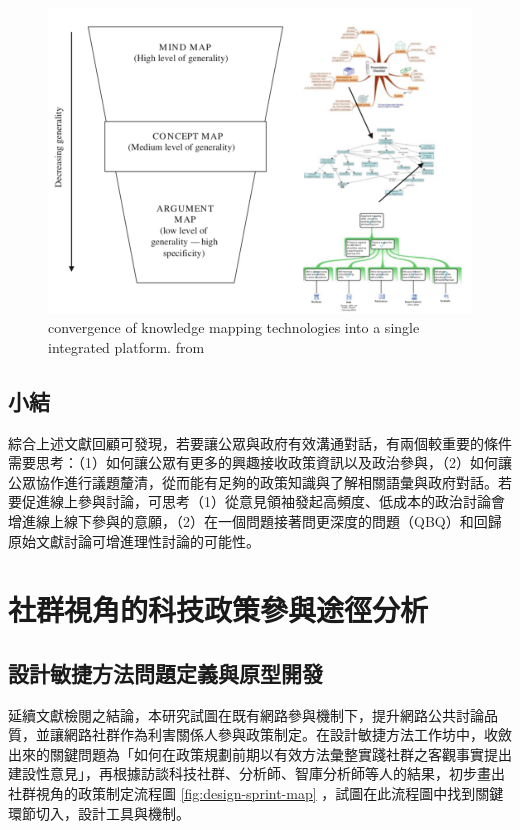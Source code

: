 \documentclass[12pt,a4paper]{article}
\begin{document}
\begin{figure}[htbp]
\centering
\includegraphics[width=.9\linewidth]{./images/kmap.png}
\caption{\label{fig:orgbed9a4f}
convergence of knowledge mapping technologies into a single integrated platform. from \citep*{davies10}}
\end{figure}
\subsection{小結}
\label{sec:orga330d93}
綜合上述文獻回顧可發現，若要讓公眾與政府有效溝通對話，有兩個較重要的條件需要思考：（1）如何讓公眾有更多的興趣接收政策資訊以及政治參與，（2）如何讓公眾協作進行議題釐清，從而能有足夠的政策知識與了解相關語彙與政府對話。若要促進線上參與討論，可思考（1）從意見領袖發起高頻度、低成本的政治討論會增進線上線下參與的意願，（2）在一個問題接著問更深度的問題（QBQ）和回歸原始文獻討論可增進理性討論的可能性。
\section{社群視角的科技政策參與途徑分析 }
\label{sec:orgb9437c0}
\subsection{設計敏捷方法問題定義與原型開發}
\label{sec:org8c769a7}
延續文獻檢閱之結論，本研究試圖在既有網路參與機制下，提升網路公共討論品質，並讓網路社群作為利害關係人參與政策制定。在設計敏捷方法工作坊中，收斂出來的關鍵問題為「如何在政策規劃前期以有效方法彙整實踐社群之客觀事實提出建設性意見」，再根據訪談科技社群、分析師、智庫分析師等人的結果，初步畫出社群視角的政策制定流程圖 \ref{fig:design-sprint-map} ，試圖在此流程圖中找到關鍵環節切入，設計工具與機制。
\end{document}
